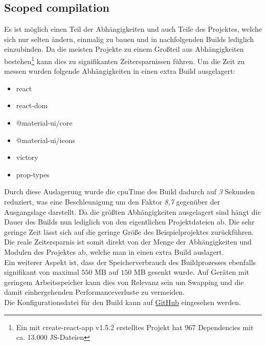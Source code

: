 \documentclass[11pt]{report}
\begin{document}
        	\subsection{Scoped compilation}
        		\label{section:scopedCompilation}
        		Es ist möglich einen Teil der Abhängigkeiten und auch Teile des Projektes, welche sich nur selten ändern, einmalig zu bauen und in nachfolgenden Builds lediglich einzubinden. Da die meisten Projekte zu einem Großteil aus Abhängigkeiten bestehen\footnote{Ein mit create-react-app v1.5.2 erstelltes Projekt hat 967 Dependencies mit ca. 13.000 JS-Dateien} kann dies zu signifikanten Zeitersparnissen führen. Um die Zeit zu messen wurden folgende Abhängigkeiten in einen extra Build ausgelagert:
        		\begin{itemize}
        			\item react
        			\item react-dom
        			\item @material-ui/core
        			\item @material-ui/icons
        			\item victory
        			\item prop-types
        		\end{itemize}
        		Durch diese Auslagerung wurde die \Gls{cpuTime} des Build dadurch auf \emph{3} Sekunden reduziert, was eine Beschleunigung um den Faktor \emph{8,7} gegenüber der Ausgangslage darstellt. Da die größten Abhängigkeiten ausgelagert sind hängt die Dauer des Builds nun lediglich von den eigentlichen Projektdateien ab. Die sehr geringe Zeit lässt sich auf die geringe Größe des Beispielprojektes zurückführen. Die reale Zeitersparnis ist somit direkt von der Menge der Abhängigkeiten und Modulen des Projektes ab, welche man in einen extra Build auslagert.\\
        		Ein weiterer Aspekt ist, dass der Speicherverbrauch des Buildprozesses ebenfalls signifikant von maximal $550$ MB auf $150$ MB gesenkt wurde. Auf Geräten mit geringem Arbeitsspeicher kann dies von Relevanz sein um Swapping und die damit einhergehenden Performanceverluste zu vermeiden.\\
        		Die Konfigurationsdatei für den Build kann auf \href{https://github.com/TexNAK/WebBundlerOptimization/compare/master...nondestr_scopedCompilation#diff-1fb5683b1e7adbcee273b7f9f9a08a22}{GitHub} eingesehen werden.

\end{document}
